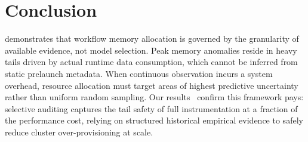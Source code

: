 \section{Conclusion}
\label{sec:conclusion}


\toolname demonstrates that workflow memory allocation is governed by the granularity of available evidence, not model selection. Peak memory anomalies reside in heavy tails driven by actual runtime data consumption, which cannot be inferred from static prelaunch metadata. When continuous observation incurs a system overhead, resource allocation 
must target areas of highest predictive uncertainty rather than uniform random sampling. Our results~\cite{campArtifact} confirm this framework pays: selective auditing captures the tail safety of full instrumentation at a fraction of the performance cost, relying on structured historical empirical evidence to safely reduce cluster over-provisioning at scale.